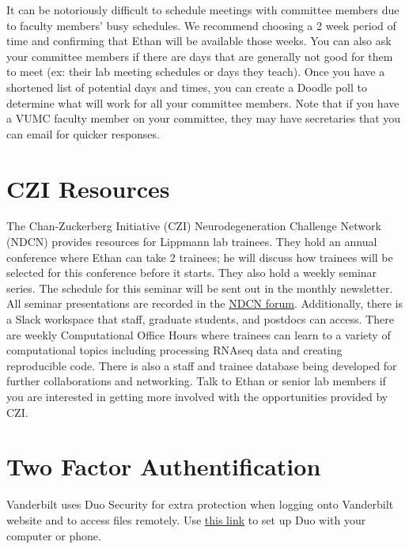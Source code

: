 \documentclass[
]{book}
\begin{document}
It can be notoriously difficult to schedule meetings with committee members due to faculty members' busy schedules. We recommend choosing a 2 week period of time and confirming that Ethan will be available those weeks. You can also ask your committee members if there are days that are generally not good for them to meet (ex: their lab meeting schedules or days they teach). Once you have a shortened list of potential days and times, you can create a Doodle poll to determine what will work for all your committee members. Note that if you have a VUMC faculty member on your committee, they may have secretaries that you can email for quicker responses.

\hypertarget{czi-resources}{%
\section{CZI Resources}\label{czi-resources}}

The Chan-Zuckerberg Initiative (CZI) Neurodegeneration Challenge Network (NDCN) provides resources for Lippmann lab trainees. They hold an annual conference where Ethan can take 2 trainees; he will discuss how trainees will be selected for this conference before it starts. They also hold a weekly seminar series. The schedule for this seminar will be sent out in the monthly newsletter. All seminar presentations are recorded in the \href{https://ndcn-forum.cziscience.com/}{NDCN forum}. Additionally, there is a Slack workspace that staff, graduate students, and postdocs can access. There are weekly Computational Office Hours where trainees can learn to a variety of computational topics including processing RNAseq data and creating reproducible code. There is also a staff and trainee database being developed for further collaborations and networking. Talk to Ethan or senior lab members if you are interested in getting more involved with the opportunities provided by CZI.

\hypertarget{duo}{%
\section{Two Factor Authentification}\label{duo}}

Vanderbilt uses Duo Security for extra protection when logging onto Vanderbilt website and to access files remotely. Use \href{https://it.vanderbilt.edu/services/catalog/security/identity_and_access_management/Multi_Factor_Authentication.php}{this link} to set up Duo with your computer or phone.
\end{document}
